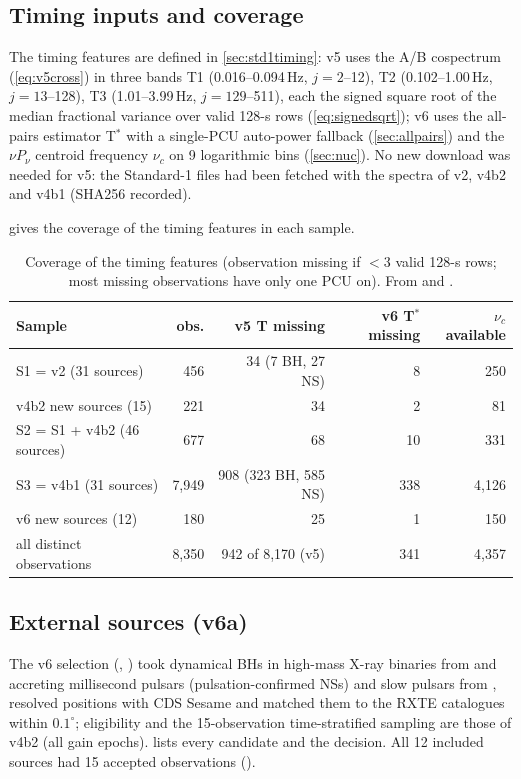 \subsection{Timing inputs and coverage}
The timing features are defined in \cref{sec:std1timing}: v5 uses the A/B cospectrum (\cref{eq:v5cross}) in three bands
T1 (0.016--0.094\,Hz, $j=2$--12), T2 (0.102--1.00\,Hz, $j=13$--128), T3 (1.01--3.99\,Hz, $j=129$--511), each the signed
square root of the median fractional variance over valid 128-s rows (\cref{eq:signedsqrt}); v6 uses the all-pairs
estimator T$^*$ with a single-PCU auto-power fallback (\cref{sec:allpairs}) and the $\nu P_\nu$ centroid frequency
$\nu_c$ on 9 logarithmic bins (\cref{sec:nuc}). No new download was needed for v5: the Standard-1 files had been fetched
with the spectra of v2, v4b2 and v4b1 (SHA256 recorded).

 gives the coverage of the timing features in each sample.

\begin{table}[htbp]
\centering\small
\caption[Timing-feature coverage]{Coverage of the timing features (observation missing if $<3$ valid 128-s rows; most
missing observations have only one PCU on). From  and
.}
\label{tab:p3coverage}
\begin{tabular}{@{}lrrrr@{}}
\toprule
Sample & obs. & v5 T missing & v6 T$^*$ missing & $\nu_c$ available \\
\midrule
S1 = v2 (31 sources) & 456 & 34 (7 BH, 27 NS) & 8 & 250 \\
v4b2 new sources (15) & 221 & 34 & 2 & 81 \\
S2 = S1 + v4b2 (46 sources) & 677 & 68 & 10 & 331 \\
S3 = v4b1 (31 sources) & 7,949 & 908 (323 BH, 585 NS) & 338 & 4,126 \\
v6 new sources (12) & 180 & 25 & 1 & 150 \\
\midrule
all distinct observations & 8,350 & 942 of 8,170 (v5) & 341 & 4,357 \\
\bottomrule
\end{tabular}
\end{table}

\subsection{External sources (v6a)}
The v6 selection (, ) took dynamical BHs in
high-mass X-ray binaries from \citet[\S3, Table 2]{CasaresJonker2014} and accreting millisecond pulsars (pulsation-confirmed
NSs) and slow pulsars from \citet[Table 1]{PatrunoWatts2021}, resolved positions with CDS Sesame and matched them to the
RXTE catalogues within $0.1^\circ$; eligibility and the 15-observation time-stratified sampling are those of v4b2 (all
gain epochs).  lists every candidate and the decision. All 12 included sources had 15 accepted
observations ().

